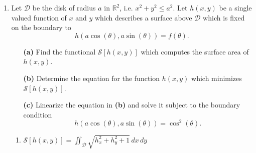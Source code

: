 \documentclass[10pt,letterpaper]{report}
\newcommand{\R}{\mathbb{R}}
\begin{document}
\begin{enumerate}
\item
\begin{qbox}
Let $\mathcal D$ be the disk of radius $a$ in $\R^2$, i.e. $x^2 + y^2 \leq a^2$. Let $h(x, y)$ be a single valued function of $x$ and $y$ which describes a surface above $\mathcal D$ which is fixed on the boundary to 
\[h(a \cos(\theta), a \sin(\theta)) = f(\theta).\]
\begin{itemize}
    \item[\textbf{(a)}] Find the functional $\mathcal S[h(x, y)]$ which computes the surface area of $h(x, y)$.
    \item[\textbf{(b)}] Determine the equation for the function $h(x, y)$ which minimizes $\mathcal S[h(x, y)]$.
    \item[\textbf{(c)}] Linearize the equation in \textbf{(b)} and solve it subject to the boundary condition
    \[ h(a \cos(\theta), a \sin(\theta)) = \cos^2(\theta).\]
\end{itemize}
\end{qbox}

\begin{enumerate}
    \item $\displaystyle{\mathcal S[h(x,y)] = \iint_{\mathcal D} \sqrt{h_x^2 + h_y^2 + 1}\,dx\,dy}$
    

\end{enumerate}
\end{enumerate}
\end{document}
